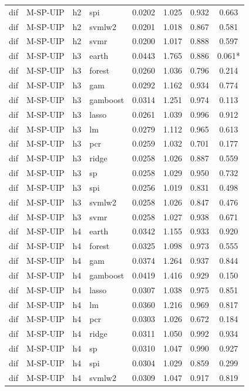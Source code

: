 \begin{ThreePartTable}
\begin{longtable}[t]{llclcccc}
dif & M-SP-UIP & h2 & spi & 0.0202 & 1.025 & 0.932 & 0.663\\
dif & M-SP-UIP & h2 & svmlw2 & 0.0201 & 1.018 & 0.867 & 0.581\\
dif & M-SP-UIP & h2 & svmr & 0.0200 & 1.017 & 0.888 & 0.597\\
\addlinespace
dif & M-SP-UIP & h3 & earth & 0.0443 & 1.765 & 0.886 & 0.061*\\
dif & M-SP-UIP & h3 & forest & 0.0260 & 1.036 & 0.796 & 0.214\\
dif & M-SP-UIP & h3 & gam & 0.0292 & 1.162 & 0.934 & 0.774\\
dif & M-SP-UIP & h3 & gamboost & 0.0314 & 1.251 & 0.974 & 0.113\\
dif & M-SP-UIP & h3 & lasso & 0.0261 & 1.039 & 0.996 & 0.912\\
dif & M-SP-UIP & h3 & lm & 0.0279 & 1.112 & 0.965 & 0.613\\
dif & M-SP-UIP & h3 & pcr & 0.0259 & 1.032 & 0.701 & 0.177\\
dif & M-SP-UIP & h3 & ridge & 0.0258 & 1.026 & 0.887 & 0.559\\
dif & M-SP-UIP & h3 & sp & 0.0258 & 1.029 & 0.950 & 0.732\\
dif & M-SP-UIP & h3 & spi & 0.0256 & 1.019 & 0.831 & 0.498\\
dif & M-SP-UIP & h3 & svmlw2 & 0.0258 & 1.026 & 0.847 & 0.476\\
dif & M-SP-UIP & h3 & svmr & 0.0258 & 1.027 & 0.938 & 0.671\\
\addlinespace
dif & M-SP-UIP & h4 & earth & 0.0342 & 1.155 & 0.933 & 0.920\\
dif & M-SP-UIP & h4 & forest & 0.0325 & 1.098 & 0.973 & 0.555\\
dif & M-SP-UIP & h4 & gam & 0.0374 & 1.264 & 0.937 & 0.844\\
dif & M-SP-UIP & h4 & gamboost & 0.0419 & 1.416 & 0.929 & 0.150\\
dif & M-SP-UIP & h4 & lasso & 0.0307 & 1.038 & 0.975 & 0.851\\
dif & M-SP-UIP & h4 & lm & 0.0360 & 1.216 & 0.969 & 0.817\\
dif & M-SP-UIP & h4 & pcr & 0.0303 & 1.026 & 0.672 & 0.184\\
dif & M-SP-UIP & h4 & ridge & 0.0311 & 1.050 & 0.992 & 0.934\\
dif & M-SP-UIP & h4 & sp & 0.0310 & 1.047 & 0.990 & 0.927\\
dif & M-SP-UIP & h4 & spi & 0.0304 & 1.029 & 0.859 & 0.299\\
dif & M-SP-UIP & h4 & svmlw2 & 0.0309 & 1.047 & 0.917 & 0.819\\

\end{longtable}
\end{ThreePartTable}
